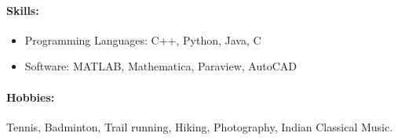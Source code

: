 \documentclass[10pt,fleqn]{article}
\begin{document}
\paragraph*{Skills:}
\vspace{-10pt}
\begin{itemize}
\setlength{\itemsep}{0pt}
\setlength{\parskip}{0pt}
\item Programming Languages: C++, Python, Java, C
\item Software: MATLAB, Mathematica, Paraview, AutoCAD
\end{itemize}
\vspace{-10pt}
\paragraph*{Hobbies:} Tennis, Badminton, Trail running, Hiking, Photography, Indian Classical Music.
\vspace{-10pt}
\end{document}
